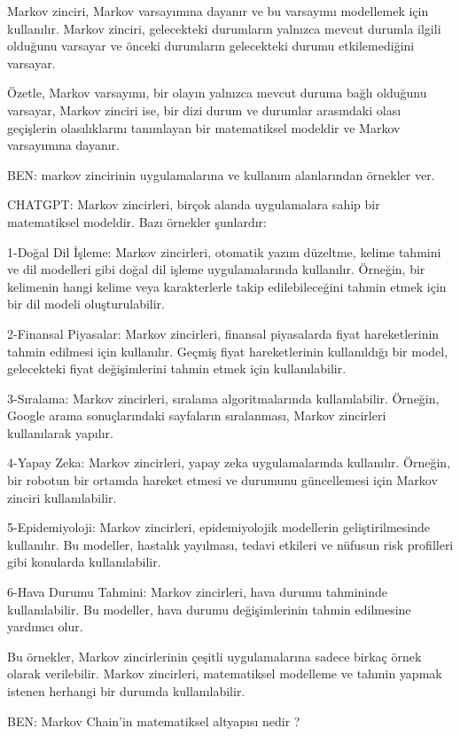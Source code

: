 \documentclass[11pt]{article}
\begin{document}
Markov zinciri, Markov varsayımına dayanır ve bu varsayımı modellemek için kullanılır. Markov zinciri, gelecekteki durumların yalnızca mevcut durumla ilgili olduğunu varsayar ve önceki durumların gelecekteki durumu etkilemediğini varsayar.

Özetle, Markov varsayımı, bir olayın yalnızca mevcut duruma bağlı olduğunu varsayar, Markov zinciri ise, bir dizi durum ve durumlar arasındaki olası geçişlerin olasılıklarını tanımlayan bir matematiksel modeldir ve Markov varsayımına dayanır.

BEN: markov zincirinin uygulamalarına ve kullanım alanlarından örnekler ver.

CHATGPT: Markov zincirleri, birçok alanda uygulamalara sahip bir matematiksel modeldir. Bazı örnekler şunlardır:

1-Doğal Dil İşleme: Markov zincirleri, otomatik yazım düzeltme, kelime tahmini ve dil modelleri gibi doğal dil işleme uygulamalarında kullanılır. Örneğin, bir kelimenin hangi kelime veya karakterlerle takip edilebileceğini tahmin etmek için bir dil modeli oluşturulabilir.

2-Finansal Piyasalar: Markov zincirleri, finansal piyasalarda fiyat hareketlerinin tahmin edilmesi için kullanılır. Geçmiş fiyat hareketlerinin kullanıldığı bir model, gelecekteki fiyat değişimlerini tahmin etmek için kullanılabilir.

3-Sıralama: Markov zincirleri, sıralama algoritmalarında kullanılabilir. Örneğin, Google arama sonuçlarındaki sayfaların sıralanması, Markov zincirleri kullanılarak yapılır.

4-Yapay Zeka: Markov zincirleri, yapay zeka uygulamalarında kullanılır. Örneğin, bir robotun bir ortamda hareket etmesi ve durumunu güncellemesi için Markov zinciri kullanılabilir.

5-Epidemiyoloji: Markov zincirleri, epidemiyolojik modellerin geliştirilmesinde kullanılır. Bu modeller, hastalık yayılması, tedavi etkileri ve nüfusun risk profilleri gibi konularda kullanılabilir.

6-Hava Durumu Tahmini: Markov zincirleri, hava durumu tahmininde kullanılabilir. Bu modeller, hava durumu değişimlerinin tahmin edilmesine yardımcı olur.

Bu örnekler, Markov zincirlerinin çeşitli uygulamalarına sadece birkaç örnek olarak verilebilir. Markov zincirleri, matematiksel modelleme ve tahmin yapmak istenen herhangi bir durumda kullanılabilir.

BEN: Markov Chain'in matematiksel altyapısı nedir ?
\end{document}
